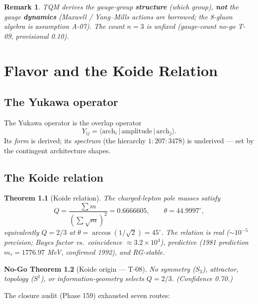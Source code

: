 \documentclass[11pt,twoside]{book}
\newtheorem{theorem}{Theorem}[chapter]
\newtheorem{remark}[theorem]{Remark}
\newtheorem{nogo}[theorem]{No-Go Theorem}
\begin{document}
\begin{remark}
TQM derives the gauge-group \textbf{structure} (which group), \textbf{not} the gauge
\textbf{dynamics} (Maxwell / Yang--Mills actions are borrowed; the 8-gluon algebra is
assumption A-07). The count $n=3$ is unfixed (gauge-count no-go T-09, provisional 0.10).
\end{remark}


\chapter{Flavor and the Koide Relation}
\label{ch:flavor}

\section{The Yukawa operator}

The Yukawa operator is the overlap operator
\begin{equation}
Y_{ij} = \langle \mathrm{arch}_i \,|\,\mathrm{amplitude}\,|\,\mathrm{arch}_j\rangle .
\end{equation}
Its \emph{form} is derived; its \emph{spectrum} (the hierarchy $1{:}207{:}3478$) is
underived — set by the contingent architecture shapes.

\section{The Koide relation}

\begin{theorem}[Koide relation]
The charged-lepton pole masses satisfy
\begin{equation}
Q = \frac{\sum m}{(\sum\sqrt{m})^2} = 0.6666605,
\qquad \theta = 44.9997^\circ,
\end{equation}
equivalently $Q=2/3$ at $\theta=\arccos(1/\sqrt2)=45^\circ$. The relation is real
($\sim10^{-5}$ precision; Bayes factor vs.\ coincidence $\approx3.2\times10^4$), predictive
(1981 prediction $m_\tau=1776.97$ MeV, confirmed 1992), and RG-stable.
\end{theorem}

\begin{nogo}[Koide origin — T-08]
No symmetry ($S_3$), attractor, topology ($S^1$), or information-geometry selects $Q=2/3$.
(Confidence 0.70.)
\end{nogo}

The closure audit (Phase 159) exhausted seven routes:
\end{document}
